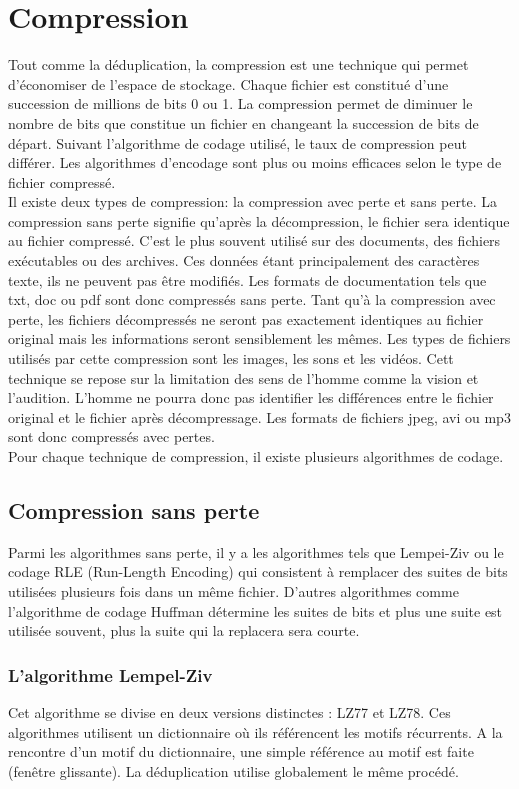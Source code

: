 \documentclass[a4paper]{report}
\begin{document}
	\chapter{Compression}
	Tout comme la déduplication, la compression est une technique qui permet d'économiser de l'espace de stockage. Chaque fichier est constitué d'une succession de millions de bits 0 ou 1. La compression permet de diminuer le nombre de bits que constitue un fichier en changeant la succession de bits de départ. Suivant l'algorithme de codage utilisé, le taux de compression peut différer. Les algorithmes d'encodage sont plus ou moins efficaces selon le type de fichier compressé.\\
 Il existe deux types de compression: la compression avec perte et sans perte. La compression sans perte signifie qu'après la décompression, le fichier sera identique au fichier compressé. C'est le plus souvent utilisé sur des documents, des fichiers exécutables ou des archives. Ces données étant principalement des caractères texte, ils ne peuvent pas être modifiés. Les formats de documentation tels que txt, doc ou pdf sont donc compressés sans perte.  Tant qu'à la compression avec perte, les fichiers décompressés ne seront pas exactement identiques au fichier original mais les informations seront sensiblement les mêmes. Les types de fichiers utilisés par cette compression sont les images, les sons et les vidéos. Cett technique se repose sur la limitation des sens de l'homme comme la vision et l'audition. L'homme ne pourra donc pas identifier les différences entre le fichier original et le fichier après décompressage. Les formats de fichiers jpeg, avi ou mp3 sont donc compressés avec pertes. \\
Pour chaque technique de compression, il existe plusieurs algorithmes de codage.\\
	\section{Compression sans perte}
	Parmi les algorithmes sans perte, il y a les algorithmes tels que Lempei-Ziv ou le codage RLE (Run-Length Encoding) qui consistent à remplacer des suites de bits utilisées plusieurs fois dans un même fichier. D'autres algorithmes comme l'algorithme de codage Huffman détermine les suites de bits et plus une suite est utilisée souvent, plus la suite qui la replacera sera courte.
	\subsection{L'algorithme Lempel-Ziv}
		Cet algorithme se divise en deux versions distinctes : LZ77 et LZ78. Ces algorithmes utilisent un dictionnaire où ils référencent les motifs récurrents. A la rencontre d'un motif du dictionnaire, une simple référence au motif est faite (fenêtre glissante). La déduplication utilise globalement le même procédé.\\
\end{document}
